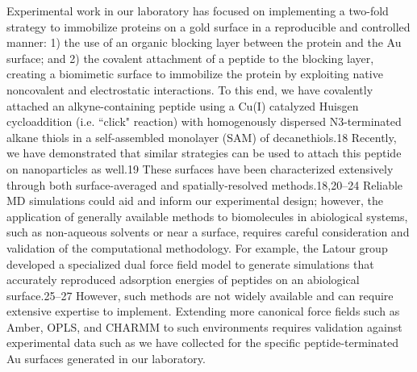 Experimental work in our laboratory has focused on implementing a two-fold strategy to immobilize proteins on a gold surface in a reproducible and controlled manner: 1) the use of an organic blocking layer between the protein and the Au surface; and 2) the covalent attachment of a peptide to the blocking layer, creating a biomimetic surface to immobilize the protein by exploiting native noncovalent and electrostatic interactions. 
To this end, we have covalently attached an alkyne-containing peptide using a Cu(I) catalyzed Huisgen cycloaddition (i.e. ``click" reaction) with homogenously dispersed N3-terminated alkane thiols in a self-assembled monolayer (SAM) of decanethiols.18 
Recently, we have demonstrated that similar strategies can be used to attach this peptide on nanoparticles as well.19 
These surfaces have been characterized extensively through both surface-averaged and spatially-resolved methods.18,20–24 
Reliable MD simulations could aid and inform our experimental design; however, the application of generally available methods to biomolecules in abiological systems, such as non-aqueous solvents or near a surface, requires careful consideration and validation of the computational methodology. 
For example, the Latour group developed a specialized dual force field model to generate simulations that accurately reproduced adsorption energies of peptides on an abiological surface.25–27 
However, such methods are not widely available and can require extensive expertise to implement. 
Extending more canonical force fields such as Amber, OPLS, and CHARMM to such environments requires validation against experimental data such as we have collected for the specific peptide-terminated Au surfaces generated in our laboratory.

